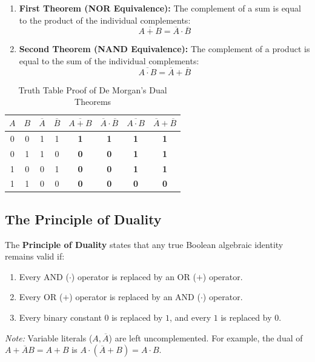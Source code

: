 \begin{enumerate}[label=\bfseries\arabic*.]
    \item \textbf{First Theorem (NOR Equivalence):} The complement of a sum is equal to the product of the individual complements:
    \begin{equation}
    \label{eq:demorgan_1}
    \overline{A + B} = \overline{A} \cdot \overline{B}
    \end{equation}
    \item \textbf{Second Theorem (NAND Equivalence):} The complement of a product is equal to the sum of the individual complements:
    \begin{equation}
    \label{eq:demorgan_2}
    \overline{A \cdot B} = \overline{A} + \overline{B}
    \end{equation}
\end{enumerate}

\begin{table}[htbp]
\centering
\small
\caption{Truth Table Proof of De Morgan's Dual Theorems}
\label{tab:demorgan_proof}
\begin{tabular}{c c c c c c c c}
\toprule
$A$ & $B$ & $\overline{A}$ & $\overline{B}$ & $\overline{A + B}$ & $\overline{A} \cdot \overline{B}$ & $\overline{A \cdot B}$ & $\overline{A} + \overline{B}$ \\
\midrule
0 & 0 & 1 & 1 & \textbf{1} & \textbf{1} & \textbf{1} & \textbf{1} \\
0 & 1 & 1 & 0 & \textbf{0} & \textbf{0} & \textbf{1} & \textbf{1} \\
1 & 0 & 0 & 1 & \textbf{0} & \textbf{0} & \textbf{1} & \textbf{1} \\
1 & 1 & 0 & 0 & \textbf{0} & \textbf{0} & \textbf{0} & \textbf{0} \\
\bottomrule
\end{tabular}
\end{table}

\subsection{The Principle of Duality}
The \textbf{Principle of Duality} states that any true Boolean algebraic identity remains valid if:
\begin{enumerate}[label=\bfseries\alph*.]
    \item Every AND ($\cdot$) operator is replaced by an OR ($+$) operator.
    \item Every OR ($+$) operator is replaced by an AND ($\cdot$) operator.
    \item Every binary constant $0$ is replaced by $1$, and every $1$ is replaced by $0$.
\end{enumerate}
\textit{Note:} Variable literals ($A, \overline{A}$) are left uncomplemented. For example, the dual of $A + \overline{A}B = A + B$ is $A \cdot (\overline{A} + B) = A \cdot B$.


